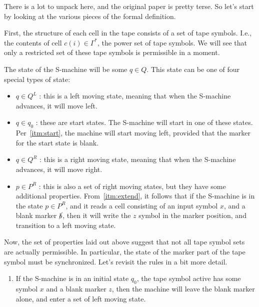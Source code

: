 \begin{aside}
There is a lot to unpack here, and the original paper is pretty terse.
So let's start by looking at the various pieces of the formal definition.

First, the structure of each cell in the tape consists of a set of tape symbols.
I.e., the contents of cell $c(i) \in \Gamma^*$, the power set of 
tape symbols.
We will see that only a restricted set of these tape symbols is
permissible in a moment.

The state of the S-machine will be some $q \in Q$.
This state can be one of four special types of state:
\begin{itemize}
\item $q \in Q^L$ : this is a left moving state, meaning that when the S-machine
advances, it will move left.
\item $q \in {q_0}$ : these are start states.
The S-machine will start in one of these states.
Per~\ref{itm:start}, the machine will start moving left, provided that the
marker for the start state is blank.
\item $q \in Q^R$ : this is a right moving state, meaning that when the S-machine
advances, it will move right.
\item $p \in P^R$ : this is also a set of right moving states, but they have some
additional properties.
From~\ref{itm:extend}, it follows that if the S-machine
is in the state $p \in P^R$, and it reads a cell consisting of an input symbol $x$,
and a blank marker $\cancel{b}$, then it will write the $z$ symbol in the marker position,
and transition to a left moving state.
\end{itemize}


Now, the set of properties laid out above suggest that not all tape symbol sets
are actually permissible.
In particular, the state of the marker part of the
tape symbol must be synchronized.
Let's revisit the rules in a bit more detail.

\begin{enumerate}[label=(\roman*)]
    \item If the S-machine is in an initial state $q_0$, the tape symbol active
    has some symbol $x$ and a blank marker $z$, then the machine will leave
    the blank marker alone, and enter a set of left moving state.


\end{enumerate}
\end{aside}
